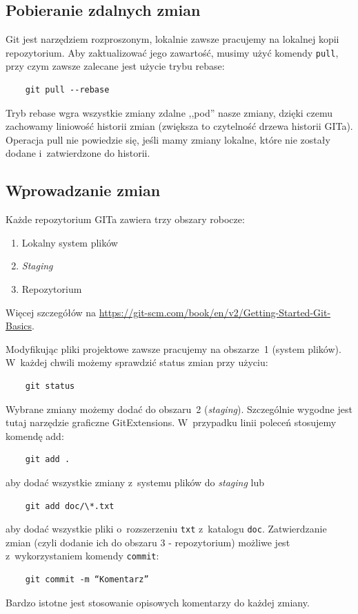 \documentclass[12pt]{article}
\begin{document}
        \subsection*{Pobieranie zdalnych zmian}
        Git jest narzędziem rozproszonym, lokalnie zawsze pracujemy na lokalnej kopii repozytorium. Aby zaktualizować jego zawartość, musimy użyć komendy \texttt{pull}, przy czym zawsze zalecane jest użycie trybu rebase:
        \begin{verbatim}
    git pull --rebase
        \end{verbatim}
        Tryb rebase wgra wszystkie zmiany zdalne ,,pod'' nasze zmiany, dzięki czemu zachowamy liniowość historii zmian (zwiększa to czytelność drzewa historii GITa). Operacja pull nie powiedzie się, jeśli mamy zmiany lokalne, które nie zostały dodane i~zatwierdzone do historii.

        \subsection*{Wprowadzanie zmian}
        Każde repozytorium GITa zawiera trzy obszary robocze:
        \begin{enumerate}
            \item Lokalny system plików
            \item \textit{Staging}
            \item Repozytorium
        \end{enumerate}
        Więcej szczegółów na \url{https://git-scm.com/book/en/v2/Getting-Started-Git-Basics}.

        Modyfikując pliki projektowe zawsze pracujemy na obszarze~1 (system plików). W~każdej chwili możemy sprawdzić status zmian przy użyciu:
        \begin{verbatim}
    git status
        \end{verbatim}
        Wybrane zmiany możemy dodać do obszaru~2 (\textit{staging}). Szczególnie wygodne jest tutaj narzędzie graficzne GitExtensions. W~przypadku linii poleceń stosujemy komendę add:
        \begin{verbatim}
    git add .
        \end{verbatim}
        aby dodać wszystkie zmiany z~systemu plików do \textit{staging} lub
        \begin{verbatim}
    git add doc/\*.txt
        \end{verbatim}
        aby dodać wszystkie pliki o~rozszerzeniu \texttt{txt} z~katalogu \texttt{doc}.
        Zatwierdzanie zmian (czyli dodanie ich do obszaru 3 - repozytorium) możliwe jest z~wykorzystaniem komendy \texttt{commit}:
        \begin{verbatim}
    git commit -m “Komentarz”
        \end{verbatim}
        Bardzo istotne jest stosowanie opisowych komentarzy do każdej zmiany.
\end{document}
